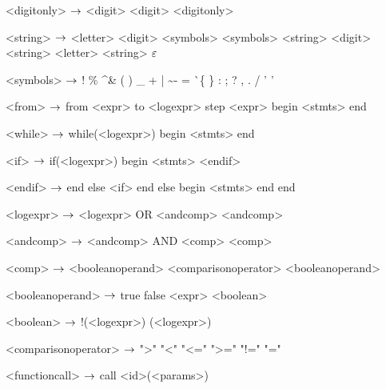 \begin{grammar}
<digitonly> $\rightarrow$ <digit>
	\alt <digit> <digitonly>

<string> $\rightarrow$ <letter>
\alt <digit>
\alt <symbols>
\alt <symbols> <string>
\alt <digit> <string>
\alt <letter> <string>
\alt $\varepsilon$

<symbols> $\rightarrow$ !
\alt \%
\alt \^
\alt \&
\alt *
\alt (
\alt )
\alt \_
\alt +
\alt |
\alt \~
\alt -
\alt =
\alt \`
\alt \{
\alt \}
\alt [
\alt ]
\alt :
\alt ;
\alt ?
\alt ,
\alt .
\alt /
\alt ' '

<from> $\rightarrow$ from <expr> to <logexpr> step <expr>
	begin
		<stmts>
	end 

<while> $\rightarrow$ while(<logexpr>)
		begin
			<stmts>
		end

<if> $\rightarrow$ if(<logexpr>)
	begin
		<stmts>
	<endif>

<endif> $\rightarrow$ end
	else <if>
	\alt end
	else
	begin
		<stmts>
	end
	\alt end

<logexpr> $\rightarrow$ <logexpr> OR <andcomp>
		\alt <andcomp>

<andcomp> $\rightarrow$ <andcomp> AND <comp>

<comp> $\rightarrow$ <booleanoperand> <comparisonoperator> <booleanoperand>

<booleanoperand> $\rightarrow$ true
		\alt false
		\alt <boolean>

<boolean> $\rightarrow$ !(<logexpr>)
		\alt (<logexpr>)

<comparisonoperator> $\rightarrow$ ">"
				\alt "<"
				\alt "<="
				\alt ">="
				\alt "!="
				\alt "="

<functioncall> $\rightarrow$ call <id>(<params>)

\end{grammar}
